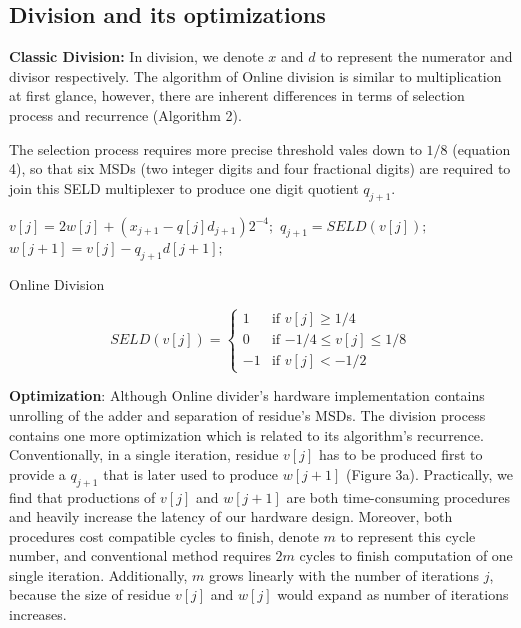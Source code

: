 \documentclass{sig-alternate}
\begin{document}
	\subsection{Division and its optimizations}
	\noindent
	{\bf Classic Division: }In division, we denote $x$ and $d$ to represent the numerator and divisor respectively. The algorithm of Online division is similar to multiplication at first glance, however, there are inherent differences in terms of selection process and recurrence (Algorithm 2).
	
	
	 The selection process requires more precise threshold vales down to $1/8$ (equation 4), so that six MSDs (two integer digits and four fractional digits) are required to join this SELD multiplexer to produce one digit quotient $q_{j+1}$.  

	          
  
  \begin{algorithm}
		  	\begin{algorithmic}[1]
		  		\newline
		  		
		  		\State $v[j] = 2w[j] + (x_{j+1}-q[j]d_{j+1})2^{-4};$
		  		\State $q_{j+1} = SELD(v[j]);$
		  		\State $w[j+1] = v[j] - q_{j+1}d[j+1];$
		  		\EndFor
		  	\end{algorithmic}
		  	\caption{Online Division}
		  	\label{alg:algorithm2}
  \end{algorithm}	
  \begin{equation}
  SELD (v[j]) = \begin{cases}
  1 &\text{if $v[j] \geq 1/4$}\\
  0 &\text{if $-1/4 \leq v[j] \leq1/8$}\\
  -1 &\text{if $v[j]<-1/2$ }
  \end{cases} 
  \end{equation}

    \noindent
  	{\bf Optimization}: Although Online divider's hardware implementation contains unrolling of the adder and separation of residue's MSDs. The division process contains one more optimization which is related to its algorithm's recurrence. Conventionally, in a single iteration, residue $v[j]$ has to be produced first to provide a $q_{j+1}$ that is later used to produce $w[j+1]$ (Figure 3a). Practically, we find that productions of $v[j]$ and $w[j+1]$ are both time-consuming procedures and heavily increase the latency of our hardware design. Moreover, both procedures cost compatible cycles to finish, denote $m$ to represent this cycle number, and conventional method requires $2m$ cycles to finish computation of one single iteration. Additionally, $m$ grows linearly with the number of iterations $j$, because the size of residue $v[j]$ and $w[j]$ would expand as number of iterations increases.    
   	
\end{document}
